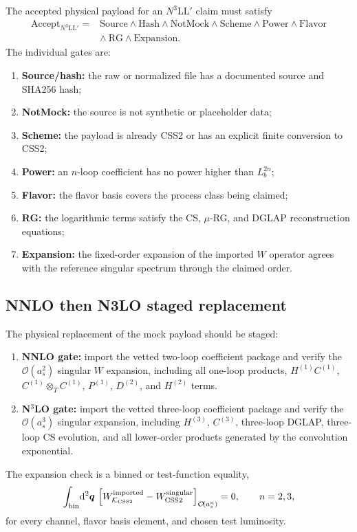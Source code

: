 \documentclass[11pt]{article}
\newcommand{\bq}{\bm{q}}
\newcommand{\dd}{\mathrm{d}}
\newcommand{\ot}{\otimes_T}
\newcommand{\order}[1]{\mathcal{O}\!\left(#1\right)}
\newcommand{\KCSS}{\mathcal K_{\rm CSS2}}
\newcommand{\CSS}{\mathrm{CSS2}}
\begin{document}
The accepted physical payload for an $N^3$LL$'$ claim must satisfy
\begin{equation}
\begin{split}
  \mathrm{Accept}_{N^3\mathrm{LL}'}
  ={}& \mathrm{Source}\wedge \mathrm{Hash}\wedge \mathrm{NotMock}
  \wedge \mathrm{Scheme}\wedge \mathrm{Power}\wedge \mathrm{Flavor}\\
  &\wedge\ \mathrm{RG}\wedge \mathrm{Expansion} .
\end{split}
\label{eq:acceptance-predicate-v15}
\end{equation}
The individual gates are:
\begin{enumerate}
  \item \textbf{Source/hash:} the raw or normalized file has a documented source and SHA256
  hash;
  \item \textbf{NotMock:} the source is not synthetic or placeholder data;
  \item \textbf{Scheme:} the payload is already CSS2 or has an explicit finite conversion to CSS2;
  \item \textbf{Power:} an $n$-loop coefficient has no power higher than $L_b^{2n}$;
  \item \textbf{Flavor:} the flavor basis covers the process class being claimed;
  \item \textbf{RG:} the logarithmic terms satisfy the CS, $\mu$-RG, and DGLAP reconstruction
  equations;
  \item \textbf{Expansion:} the fixed-order expansion of the imported $W$ operator agrees with
  the reference singular spectrum through the claimed order.
\end{enumerate}

\subsection{NNLO then N3LO staged replacement}

The physical replacement of the mock payload should be staged:
\begin{enumerate}
  \item \textbf{NNLO gate:} import the vetted two-loop coefficient package and verify the
  $\order{a_s^2}$ singular $W$ expansion, including all one-loop products,
  $H^{(1)}C^{(1)}$, $C^{(1)}\ot C^{(1)}$, $P^{(1)}$, $D^{(2)}$, and $H^{(2)}$ terms.
  \item \textbf{N$^3$LO gate:} import the vetted three-loop coefficient package and verify
  the $\order{a_s^3}$ singular expansion, including $H^{(3)}$, $C^{(3)}$, three-loop
  DGLAP, three-loop CS evolution, and all lower-order products generated by the
  convolution exponential.
\end{enumerate}
The expansion check is a binned or test-function equality,
\begin{equation}
  \int_{\rm bin}\!\dd^2\bq\,
  \left[
  W_{\KCSS}^{\rm imported}-W_{\CSS}^{\rm singular}
  \right]_{\order{a_s^n}}
  =0,
  \qquad n=2,3,
  \label{eq:vetted-expansion-gate-v15}
\end{equation}
for every channel, flavor basis element, and chosen test luminosity.
\end{document}
